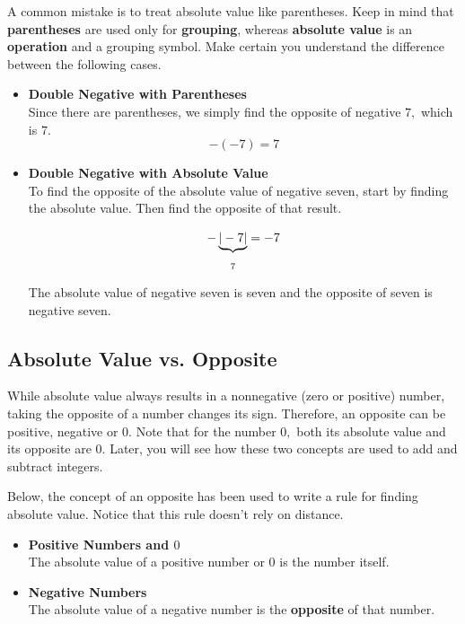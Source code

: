 \documentclass{ximera}[font=12pt]
\begin{document}
\begin{warning}

A common mistake is to treat absolute value like parentheses. Keep in mind that \textbf{parentheses} are 
used only for \textbf{grouping}, whereas \textbf{absolute value} is an \textbf{operation} and a grouping symbol.  Make certain you 
understand the difference between the following cases.  

\begin{itemize}[leftmargin=0pt]
    \item \textbf{Double Negative with Parentheses} \\
    Since there are parentheses, we simply find the opposite of negative $7,$ which is $7.$ 
    \[ -(-7) = 7 \] 

    \item \textbf{Double Negative with Absolute Value} \\
    To find the opposite of the absolute value of negative seven, start by finding the absolute value.  Then find the opposite of that result. 

    \[ - \underbrace{|-7|}_{\rule{0pt}{2.5ex} 7} = -7 \]

The absolute value of negative seven is seven and the opposite of seven is negative seven.

     

\end{itemize}

\end{warning}

\subsection*{Absolute Value vs. Opposite}

While absolute value always results in a nonnegative (zero or positive) number, taking the opposite of a number 
changes its sign.  Therefore, an opposite can be positive, negative or $0.$  Note that for the number $0,$ both 
its absolute value and its opposite are $0.$  Later, you will see how these two concepts are used to add and subtract integers.

Below, the concept of an opposite has been used to write a rule for finding absolute value.  Notice that this rule 
doesn't rely on distance.


\begin{procedure}


\begin{itemize}
    \item \textcolor{accessibleGlaucous}{\textbf{Positive Numbers and $0$}} \\
    The absolute value of a positive number or $0$ is the number itself.
    
    \item \textbf{\textcolor{accessibleGlaucous}{Negative Numbers}} \\
    The absolute value of a negative number is the \textbf{opposite} of that number.
\end{itemize}

\end{procedure}
\end{document}
